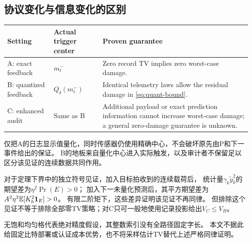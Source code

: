\subsection{协议变化与信息变化的区别}
\begin{table}[ht]\centering\small
{}
\begin{tabularx}{\linewidth}{lXX}
\toprule
Setting & Actual trigger center & Proven guarantee\\
\midrule
A: exact feedback & $m_t^-$ & Zero record TV implies zero worst-case damage.\\
B: quantized feedback & $Q_\delta(m_t^-)$ & Identical telemetry laws allow the residual damage in \eqref{eq:quant-bound}.\\
C: enhanced audit & Same as B & Additional payload or exact prediction information cannot increase worst-case damage; a general zero-damage guarantee is unknown.\\
\bottomrule
\end{tabularx}
\end{table}
仅把A的日志显示值量化，同时传感器仍使用精确中心，不会破坏原先由P和下一事件给出的保证。
B的地板来自量化中心进入实际触发，以及审计者不保留足以区分该见证的连续数据共同作用。

对于定理下界中的独立符号见证，加入目标拍收到的连续载荷后，
统计量$\gamma_k\tilde y_k^2$的期望差为$\eta^2\Pr(E)>0$；
加入下一未量化预测后，其平方期望差为$A^2\eta^2\mathbb E[K_h^2\mathbf 1_E]>0$。
有限二阶矩下，这些差异证明该见证不再同律。
但排除这个见证不等于排除全部零TV策略；对C只可一般地使用记录投影给出$V_C\le V_B$。

无饱和均匀格代表绝对精度假设，其整数索引没有全路径固定字长。
本文不据此给固定比特部署或认证成本优势，也不将采样估计TV替代上述严格同律证明。
